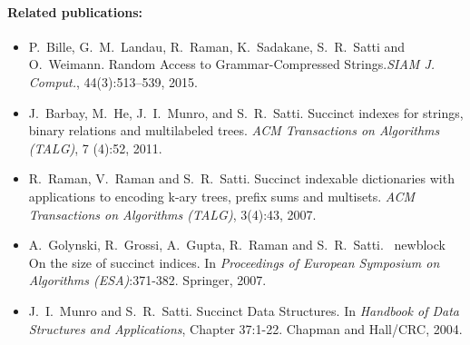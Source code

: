 \documentclass[a4paper,10pt]{article}
\begin{document}
\paragraph{Related publications:}
\begin{itemize}
\item P.~Bille, G.~M.~Landau, R.~Raman, K.~Sadakane, S.~R.~Satti and O.~Weimann. \newblock Random Access to Grammar-Compressed Strings.\newblock \emph{{SIAM} J. Comput.}, 44(3):513--539, 2015.
\item J.~Barbay, M.~He, J.~I.~Munro, and S.~R.~Satti. \newblock Succinct indexes for strings, binary relations and multilabeled trees. \newblock \emph{ACM Transactions on Algorithms (TALG)}, 7 (4):52, 2011.
\item R.~Raman, V.~Raman and S.~R.~Satti. \newblock Succinct indexable dictionaries with applications to encoding k-ary trees, prefix sums and multisets. \newblock \emph{ACM Transactions on Algorithms (TALG)}, 3(4):43, 2007.
\item A.~Golynski, R.~Grossi, A.~Gupta, R.~Raman and S.~R.~Satti. \ newblock On the size of succinct indices. \newblock In \emph {Proceedings of European Symposium on Algorithms (ESA)}:371-382.  Springer, 2007.
\item J.~I.~Munro and S.~R.~Satti. \newblock Succinct Data Structures. \newblock In \emph{Handbook of Data Structures and Applications}, Chapter 37:1-22. {Chapman and Hall/CRC}, 2004.
\end{itemize}


\newpage



\end{document}

